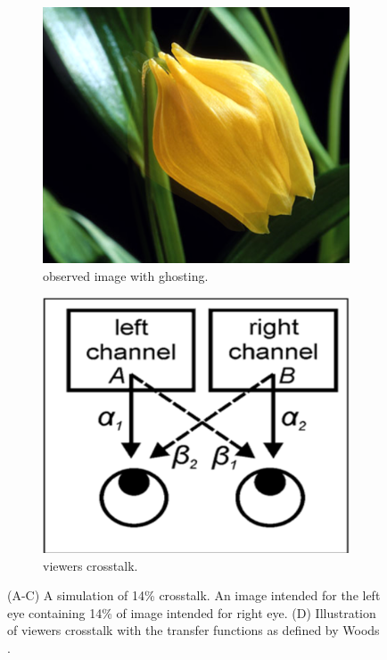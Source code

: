 \begin{figure}[htbp]
    \begin{subfigure}[t]{0.3\textwidth}
        \includegraphics[width=\textwidth]{./Template_Figures/crosstalk}
        \caption{observed image with ghosting.}\label{fig:imWCT}
    \end{subfigure}
    \begin{subfigure}[t]{0.3\textwidth}
        \includegraphics[width=\textwidth]{./Template_Figures/viewerCT}
        \caption{viewers crosstalk.}\label{fig:viewerCT}
    \end{subfigure}

    \caption{(A-C) A simulation of 14\% crosstalk. An image intended for the left eye containing 14\% of image intended for right eye. (D) Illustration of viewers crosstalk with the transfer functions as defined by Woods \cite{woods2012crosstalk}. \label{fig:ct1}}
\end{figure}

